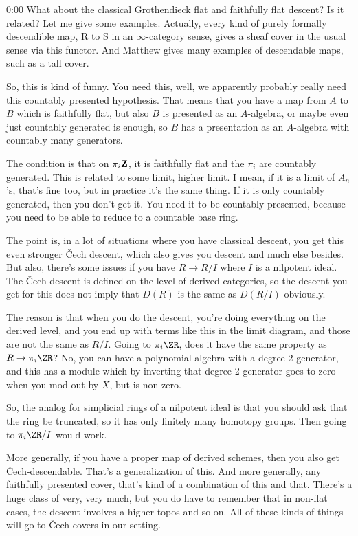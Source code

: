 \begin{unfinished}{0:00}
What about the classical Grothendieck flat and faithfully flat descent? Is it related? Let me give some examples. Actually, every kind of purely formally descendible map, R to S in an $\infty$-category sense, gives a sheaf cover in the usual sense via this functor. And Matthew gives many examples of descendable maps, such as a tall cover.

So, this is kind of funny. You need this, well, we apparently probably really need this countably presented hypothesis. That means that you have a map from $A$ to $B$ which is faithfully flat, but also $B$ is presented as an $A$-algebra, or maybe even just countably generated is enough, so $B$ has a presentation as an $A$-algebra with countably many generators.

The condition is that on $\pi_i \mathbf Z$, it is faithfully flat and the $\pi_i$ are countably generated. This is related to some limit, higher limit. I mean, if it is a limit of $A_n$'s, that's fine too, but in practice it's the same thing. If it is only countably generated, then you don't get it. You need it to be countably presented, because you need to be able to reduce to a countable base ring.

The point is, in a lot of situations where you have classical descent, you get this even stronger Čech descent, which also gives you descent and much else besides. But also, there's some issues if you have $R \to R/I$ where $I$ is a nilpotent ideal. The Čech descent is defined on the level of derived categories, so the descent you get for this does not imply that $D(R)$ is the same as $D(R/I)$ obviously.

The reason is that when you do the descent, you're doing everything on the derived level, and you end up with terms like this in the limit diagram, and those are not the same as $R/I$. Going to $\pi_i \ZR$, does it have the same property as $R \to \pi_i \ZR$? No, you can have a polynomial algebra with a degree 2 generator, and this has a module which by inverting that degree 2 generator goes to zero when you mod out by $X$, but is non-zero.

So, the analog for simplicial rings of a nilpotent ideal is that you should ask that the ring be truncated, so it has only finitely many homotopy groups. Then going to $\pi_i \ZR/I$ would work.

More generally, if you have a proper map of derived schemes, then you also get Čech-descendable. That's a generalization of this. And more generally, any faithfully presented cover, that's kind of a combination of this and that. There's a huge class of very, very much, but you do have to remember that in non-flat cases, the descent involves a higher topos and so on. All of these kinds of things will go to Čech covers in our setting.


\end{unfinished}
